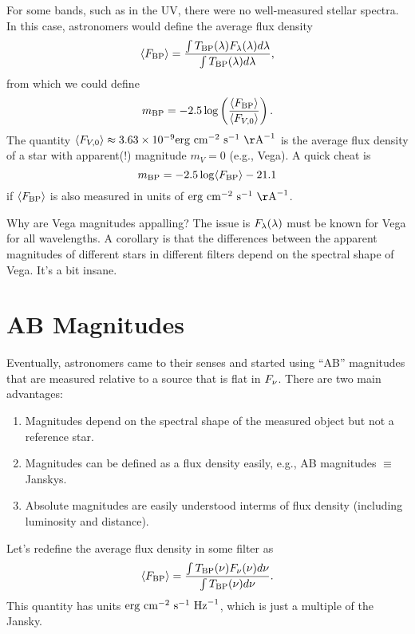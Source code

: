 \documentclass[12pt]{article}
\begin{document}
For some bands, such as in the UV, there were no well-measured stellar spectra.  In this case,
astronomers would define the average flux density
\begin{equation}
\label{eqn:average_flux_density_lambda}
\langle F_{\mathrm{BP}}\rangle = \frac{\int T_{\mathrm{BP}}(\lambda) F_{\lambda}(\lambda) d\lambda}{\int T_{\mathrm{BP}}(\lambda) d\lambda},
\end{equation}
\noindent
from which we could define
\begin{equation}
m_{\mathrm{BP}} = -2.5 \log \left( \frac{\langle F_{\mathrm{BP}}\rangle}{\langle F_{V,0}\rangle}\right).
\end{equation}
\noindent
The quantity $\ave{F_{V,0}} \approx 3.63 \times 10^{-9} \erg~\cm^{-2}~\s^{-1}~\Ang^{-1}$ 
is the average flux density of a star with apparent(!) magnitude $m_{V}=0$ (e.g., Vega).
A quick cheat is
\begin{equation}
m_{\mathrm{BP}} = -2.5 \log \langle F_{\mathrm{BP}}\rangle - 21.1
\end{equation}
\noindent
if $\langle F_{\mathrm{BP}}\rangle$ is also measured in units of $\erg~\cm^{-2}~\s^{-1}~\Ang^{-1}$.

Why are Vega magnitudes appalling? The issue is $F_{\lambda}(\lambda)$ must be known for Vega
for all wavelengths. A corollary is that the differences between the apparent magnitudes
of different stars in different filters depend on the spectral shape of Vega. It's a bit
insane.

\section{AB Magnitudes}

Eventually, astronomers came to their senses and started using ``AB'' magnitudes that are measured 
relative to a source that is flat in $F_{\nu}$. There are two main advantages:

\begin{enumerate}
\item Magnitudes depend on the spectral shape of the measured object but not a reference star.
\item Magnitudes can be defined as a flux density easily, e.g., AB magnitudes $\equiv$ Janskys.
\item Absolute magnitudes are easily understood interms of flux density (including luminosity and distance).
\end{enumerate}

Let's redefine the average flux density in some filter as
\begin{equation}
\label{eqn:average_flux_density}
\langle F_{\mathrm{BP}}\rangle = \frac{\int T_{\mathrm{BP}}(\nu) F_{\nu}(\nu) d\nu}{\int T_{\mathrm{BP}}(\nu) d\nu}.
\end{equation}
\noindent
This quantity has units $\mathrm{erg}~\mathrm{cm}^{-2}~\mathrm{s}^{-1}~\mathrm{Hz}^{-1}$, which is just a multiple
of the Jansky.
\end{document}
